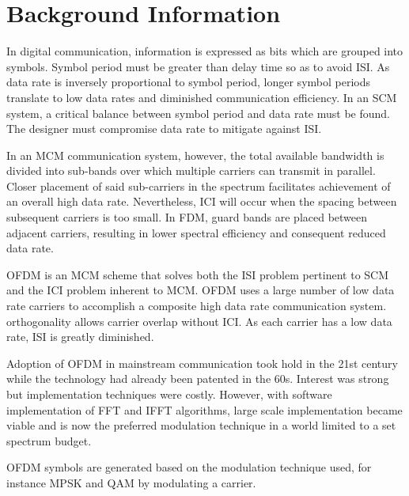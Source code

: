 
\section{Background Information}
In digital communication, information is expressed as bits which are grouped into \gls{symbol}s. Symbol period must be greater than delay time so as to avoid \gls{ISI}. As data rate is inversely proportional to symbol period, longer symbol periods translate to low data rates and diminished communication efficiency. In an \gls{SCM} system, a critical balance between symbol period and data rate must be found. The designer must compromise data rate to mitigate against \gls{ISI}.

In an \gls{MCM} communication system, however, the total available bandwidth is divided into sub-bands over which multiple carriers can transmit in parallel. Closer placement of said sub-carriers in the spectrum facilitates achievement of an overall high data rate. Nevertheless, \gls{ICI} will occur when the spacing between subsequent carriers is too small. In \gls{FDM}, guard bands are placed between adjacent carriers, resulting in lower spectral efficiency and consequent reduced data rate.

\gls{OFDM} is an \gls{MCM} scheme that solves both the \gls{ISI} problem pertinent to \gls{SCM} and the \gls{ICI} problem inherent to \gls{MCM}. \gls{OFDM} uses a large number of low data rate carriers to accomplish a composite high data rate communication system. \gls{orthogonal}ity allows carrier overlap without \gls{ICI}. As each carrier has a low data rate, \gls{ISI} is greatly diminished.

Adoption of \gls{OFDM} in mainstream communication took hold in the 21st century while the technology had already been patented in the 60s. Interest was strong but implementation techniques were costly. However, with software implementation of \gls{FFT} and \gls{IFFT} algorithms, large scale implementation became viable and is now the preferred modulation technique in a world limited to a set spectrum budget.

\gls{OFDM} \gls{symbol}s are generated based on the modulation technique used, for instance \gls{MPSK} and \gls{QAM} by modulating a carrier.


